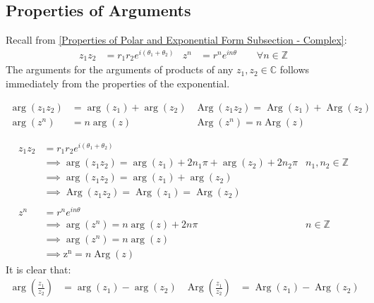 \documentclass[12pt, english]{book}
\makeatletter
\renewenvironment{proof}[1][\proofname]{\par
	\pushQED{\qed}%
	\normalfont \topsep6\p@\@plus6\p@\relax
	\list{}{%
		\settowidth{\leftmargin}{\itshape\proofname:\hskip\labelsep}%
		\setlength{\labelwidth}{0pt}%
		\setlength{\itemindent}{-\leftmargin}%
	}%
	\item[\hskip\labelsep\itshape#1\@addpunct{:}]\ignorespaces
	}{ \popQED\endlist\@endpefalse}
\makeatother
\begin{document}
	\subsection{Properties of Arguments} \label{Properties of Argumetns Subsection - Complex}
	Recall from \cref{Properties of Polar and Exponential Form Subsection - Complex}: 
	\begin{align*}
		z_1  z_2 &= r_1 r_2 e^{i(\theta_1 + \theta_2)} 
		& z^n &= r^n e^{i n \theta} \qquad \forall n \in \mathbb{Z}
	\end{align*}
	The arguments for the arguments of products of any $z_1, z_2 \in \mathbb{C}$ follows immediately from the properties of the exponential.
	\begin{corollary}
		\begin{align*}
			\arg(z_1 z_2) &= \arg(z_1) + \arg(z_2)
				& \operatorname{Arg}(z_1 z_2) = \operatorname{Arg}(z_1) + \operatorname{Arg}(z_2) \\
			\arg(z^n) &= n\arg(z)  
				& \operatorname{Arg}(z^n) = n\operatorname{Arg}(z)
		\end{align*}
		\label{Arguments of Products Corollary - Complex}
	\end{corollary}
	\begin{proof}
		\begin{align*}
			z_1  z_2 &= r_1 r_2 e^{i(\theta_1 + \theta_2)} & \\
			&\implies \arg(z_1 z_2) = \arg(z_1) + 2n_1 \pi + \arg(z_2) + 2n_2\pi
				& n_1, n_2 \in \mathbb{Z} \\
			&\implies \arg(z_1 z_2) = \arg(z_1) + \arg(z_2) & \\
			&\implies \operatorname{Arg}(z_1 z_2) = \operatorname{Arg}(z_1) = \operatorname{Arg}(z_2)  \\
			\\
			z^n &= r^n e^{i n\theta} & \\
			&\implies \arg(z^n) = n\arg(z) + 2n\pi & n \in \mathbb{Z} \\
			&\implies \arg(z^n) = n\arg(z)  \\
			&\implies \operatorname{z^n} = n\operatorname{Arg}(z)
		\end{align*}
	\end{proof}
	It is clear that: 
	\begin{align*}
		\arg\left(\frac{z_1}{z_2}\right) &= \arg(z_1) - \arg(z_2)
			& \operatorname{Arg}\left(\frac{z_1}{z_2}\right) &= \operatorname{Arg}(z_1) - \operatorname{Arg}(z_2)
	\end{align*}
\end{document}
